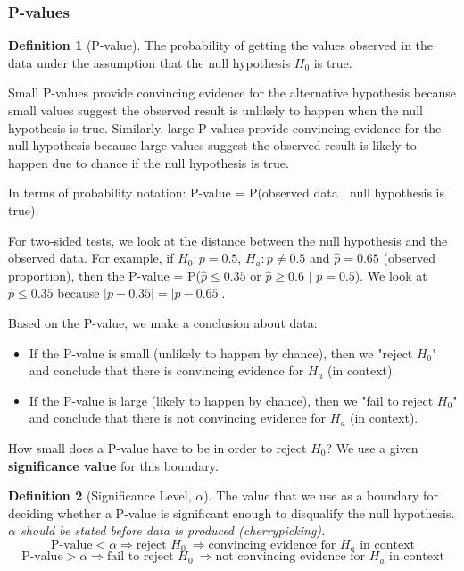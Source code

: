 \documentclass[12pt, a4paper]{article}
\theoremstyle{definition}
\newtheorem{definition}{Definition}
\begin{document}
\subsubsection{P-values}
\begin{definition}[P-value]
    The probability of getting the values observed in the data under the assumption that the null hypothesis $H_0$ is true.
\end{definition}

Small P-values provide convincing evidence for the alternative hypothesis because small values suggest the observed result is unlikely to happen when the null hypothesis is true.
Similarly, large P-values provide convincing evidence for the null hypothesis because large values suggest the observed result is likely to happen due to chance if the null hypothesis is true.

In terms of probability notation: P-value = P(observed data $|$ null hypothesis is true).

For two-sided tests, we look at the distance between the null hypothesis and the observed data.
For example, if $H_0: p = 0.5$, $H_a: p \neq 0.5$ and $\hat{p} = 0.65$ (observed proportion), then the P-value = P($\hat{p} \leq 0.35$ or $\hat{p} \geq 0.6$ $|$  $p = 0.5$).
We look at $\hat{p} \leq 0.35$ because $|p - 0.35| = |p - 0.65|$.

Based on the P-value, we make a conclusion about data:
\begin{itemize}
    \item If the P-value is small (unlikely to happen by chance), then we "reject $H_0$" and conclude that there is convincing evidence for $H_a$ (in context).
    \item If the P-value is large (likely to happen by chance), then we "fail to reject $H_0$" and conclude that there is not convincing evidence for $H_a$ (in context).
\end{itemize}

How small does a P-value have to be in order to reject $H_0$? We use a given \textbf{significance value} for this boundary.

\begin{definition}[Significance Level, $\alpha$]
    The value that we use as a boundary for deciding whether a P-value is significant enough to disqualify the null hypothesis. \textit{$\alpha$ should be stated before data is produced (cherrypicking).}
    \[\textrm{P-value} < \alpha \Rightarrow \textrm{reject } H_0\ \Rightarrow \textrm{convincing evidence for $H_a$ in context}\]
    \[\textrm{P-value} > \alpha \Rightarrow \textrm{fail to reject } H_0\ \Rightarrow \textrm{not convincing evidence for $H_a$ in context}\]
\end{definition}
\end{document}
